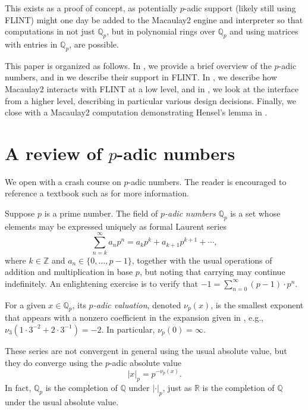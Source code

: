 \documentclass[runningheads]{llncs}
\newcommand{\QQ}{\mathbb Q}
\newcommand{\RR}{\mathbb R}
\newcommand{\ZZ}{\mathbb Z}
\begin{document}
This exists as a proof of concept, as potentially $p$-adic support (likely still using FLINT) might one day be added to the Macaulay2 engine and interpreter so that computations in not just $\QQ_p$, but in polynomial rings over $\QQ_p$ and using matrices with entries in $\QQ_p$, are possible.

This paper is organized as follows.  In , we provide a brief overview of the $p$-adic numbers, and in  we describe their support in FLINT.  In , we describe how Macaulay2 interacts with FLINT at a low level, and in , we look at the interface from a higher level, describing in particular various design decisions.  Finally, we close with a Macaulay2 computation demonstrating Hensel's lemma in .

\section{A review of $p$-adic numbers}\label{p-adic review}

We open with a crash course on $p$-adic numbers.  The reader is encouraged to reference a textbook such as \cite{gouvea} for more information.

Suppose $p$ is a prime number.  The field of \textit{$p$-adic numbers} $\QQ_p$ is a set whose elements may be expressed uniquely as formal Laurent series
\begin{equation}\label{p-adic expansion}
  \sum_{n=k}^\infty a_n p^n = a_k p^k + a_{k + 1}p^{k + 1} + \cdots,
\end{equation}
where $k\in\ZZ$ and $a_n\in\{0,\ldots,p-1\}$, together with the usual operations of addition and multiplication in base $p$, but noting that carrying may continue indefinitely.  An enlightening exercise is to verify that $-1 = \sum\limits_{n=0}^\infty(p - 1)\cdot p^n$.


For a given $x\in\QQ_p$, its \textit{$p$-adic valuation}, denoted $\nu_p(x)$, is the smallest exponent that appears with a nonzero coefficient in the expansion given in , e.g., $\nu_3(1\cdot 3^{-2} + 2\cdot 3^{-1})=-2$.  In particular, $\nu_p(0) = \infty$.

These series are not convergent in general using the usual absolute value, but they do converge using the $p$-adic absolute value
\begin{equation*}
|x|_p = p^{-\nu_p(x)}.
\end{equation*}
In fact, $\QQ_p$ is the completion of $\QQ$ under $|\cdot|_p$, just as $\RR$ is the completion of $\QQ$ under the usual absolute value.
\end{document}

